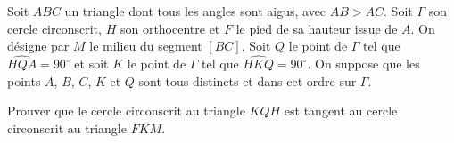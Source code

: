 Soit $ABC$ un triangle dont tous les angles sont aigus, avec $AB > AC$. Soit $\Gamma$ son cercle circonscrit,
$H$ son orthocentre et $F$ le pied de sa hauteur issue de $A$. On désigne par $M$ le milieu du segment $[BC]$.
Soit $Q$ le point de $\Gamma$ tel que $\widehat{HQA} = 90^\circ$ et soit $K$ le point de $\Gamma$ tel que
$\widehat{HKQ} = 90^\circ$. On suppose que les points $A$, $B$, $C$, $K$ et $Q$ sont tous distincts et dans cet
ordre sur $\Gamma$.

Prouver que le cercle circonscrit au triangle $KQH$ est tangent au cercle circonscrit au triangle $FKM$.
